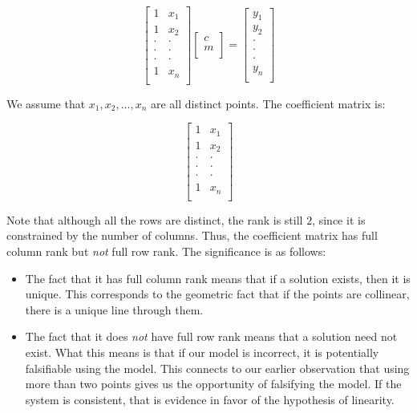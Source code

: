 \documentclass[10pt]{amsart}
\begin{document}
$$\left[\begin{matrix} 1 & x_1 \\ 1 & x_2 \\ \cdot & \cdot \\ \cdot & \cdot \\ \cdot & \cdot \\ 1 & x_n \\\end{matrix}\right]\left[\begin{matrix} c \\ m \\\end{matrix}\right] = \left[\begin{matrix} y_1 \\ y_2 \\ \cdot \\ \cdot \\ \cdot \\ y_n \\\end{matrix}\right]$$

We assume that $x_1,x_2,\dots,x_n$ are all distinct points. The
coefficient matrix is:

$$\left[\begin{matrix} 1 & x_1 \\ 1 & x_2 \\ \cdot & \cdot \\ \cdot & \cdot \\ \cdot & \cdot \\ 1 & x_n \\\end{matrix}\right]$$

Note that although all the rows are distinct, the rank is still $2$,
since it is constrained by the number of columns. Thus, the
coefficient matrix has full column rank but {\em not} full row
rank. The significance is as follows:

\begin{itemize}
\item The fact that it has full column rank means that if a solution
  exists, then it is unique. This corresponds to the geometric fact
  that if the points are collinear, there is a unique line through
  them.
\item The fact that it does {\em not} have full row rank means that a
  solution need not exist. What this means is that if our model is
  incorrect, it is potentially falsifiable using the model. This
  connects to our earlier observation that using more than two points
  gives us the opportunity of falsifying the model. If the system is
  consistent, that is evidence in favor of the hypothesis of
  linearity.
\end{itemize}
\end{document}
